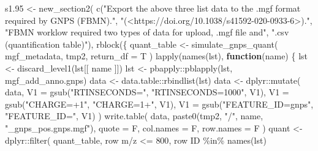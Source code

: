 \documentclass[
]{article}
\newenvironment{Shaded}{\begin{snugshade}}{\end{snugshade}}
\newcommand{\AttributeTok}[1]{\textcolor[rgb]{0.77,0.63,0.00}{#1}}
\newcommand{\ControlFlowTok}[1]{\textcolor[rgb]{0.13,0.29,0.53}{\textbf{#1}}}
\newcommand{\DecValTok}[1]{\textcolor[rgb]{0.00,0.00,0.81}{#1}}
\newcommand{\FloatTok}[1]{\textcolor[rgb]{0.00,0.00,0.81}{#1}}
\newcommand{\FunctionTok}[1]{\textcolor[rgb]{0.00,0.00,0.00}{#1}}
\newcommand{\NormalTok}[1]{#1}
\newcommand{\OtherTok}[1]{\textcolor[rgb]{0.56,0.35,0.01}{#1}}
\newcommand{\SpecialCharTok}[1]{\textcolor[rgb]{0.00,0.00,0.00}{#1}}
\newcommand{\StringTok}[1]{\textcolor[rgb]{0.31,0.60,0.02}{#1}}
\begin{document}
\begin{Shaded}
\begin{Highlighting}[]
\NormalTok{s1}\FloatTok{.95} \OtherTok{\textless{}{-}} \FunctionTok{new\_section2}\NormalTok{(}
  \FunctionTok{c}\NormalTok{(}\StringTok{"Export the above three list data to the .mgf format required by GNPS (FBMN)."}\NormalTok{,}
    \StringTok{"(\textless{}https://doi.org/10.1038/s41592{-}020{-}0933{-}6\textgreater{})."}\NormalTok{,}
    \StringTok{"FBMN worklow required two types of data for upload, .mgf file and"}\NormalTok{,}
    \StringTok{".csv (quantification table)"}\NormalTok{),}
  \FunctionTok{rblock}\NormalTok{(\{}
\NormalTok{    quant\_table }\OtherTok{\textless{}{-}} \FunctionTok{simulate\_gnps\_quant}\NormalTok{(}
\NormalTok{      mgf\_metadata, tmp2, }\AttributeTok{return\_df =}\NormalTok{ T}
\NormalTok{    )}
    \FunctionTok{lapply}\NormalTok{(}\FunctionTok{names}\NormalTok{(lst), }
      \ControlFlowTok{function}\NormalTok{(name) \{}
\NormalTok{        lst }\OtherTok{\textless{}{-}} \FunctionTok{discard\_level1}\NormalTok{(lst[[ name ]])}
\NormalTok{        lst }\OtherTok{\textless{}{-}}\NormalTok{ pbapply}\SpecialCharTok{::}\FunctionTok{pblapply}\NormalTok{(lst, mgf\_add\_anno.gnps)}
\NormalTok{        data }\OtherTok{\textless{}{-}}\NormalTok{ data.table}\SpecialCharTok{::}\FunctionTok{rbindlist}\NormalTok{(lst)}
\NormalTok{        data }\OtherTok{\textless{}{-}}\NormalTok{ dplyr}\SpecialCharTok{::}\FunctionTok{mutate}\NormalTok{(}
\NormalTok{          data, }\AttributeTok{V1 =} \FunctionTok{gsub}\NormalTok{(}\StringTok{"RTINSECONDS="}\NormalTok{, }\StringTok{"RTINSECONDS=1000"}\NormalTok{, V1),}
          \AttributeTok{V1 =} \FunctionTok{gsub}\NormalTok{(}\StringTok{"CHARGE=+1"}\NormalTok{, }\StringTok{"CHARGE=1+"}\NormalTok{, V1),}
          \AttributeTok{V1 =} \FunctionTok{gsub}\NormalTok{(}\StringTok{"FEATURE\_ID=gnps"}\NormalTok{, }\StringTok{"FEATURE\_ID="}\NormalTok{, V1)}
\NormalTok{        )}
        \FunctionTok{write.table}\NormalTok{(}
\NormalTok{          data, }\FunctionTok{paste0}\NormalTok{(tmp2, }\StringTok{"/"}\NormalTok{, name, }\StringTok{"\_gnps\_pos.gnps.mgf"}\NormalTok{),}
          \AttributeTok{quote =}\NormalTok{ F, }\AttributeTok{col.names =}\NormalTok{ F, }\AttributeTok{row.names =}\NormalTok{ F}
\NormalTok{        )}
\NormalTok{        quant }\OtherTok{\textless{}{-}}\NormalTok{ dplyr}\SpecialCharTok{::}\FunctionTok{filter}\NormalTok{(}
\NormalTok{          quant\_table, }\StringTok{\textasciigrave{}}\AttributeTok{row m/z}\StringTok{\textasciigrave{}} \SpecialCharTok{\textless{}=} \DecValTok{800}\NormalTok{, }\StringTok{\textasciigrave{}}\AttributeTok{row ID}\StringTok{\textasciigrave{}} \SpecialCharTok{\%in\%} \FunctionTok{names}\NormalTok{(lst)}

\end{Highlighting}
\end{Shaded}
\end{document}

